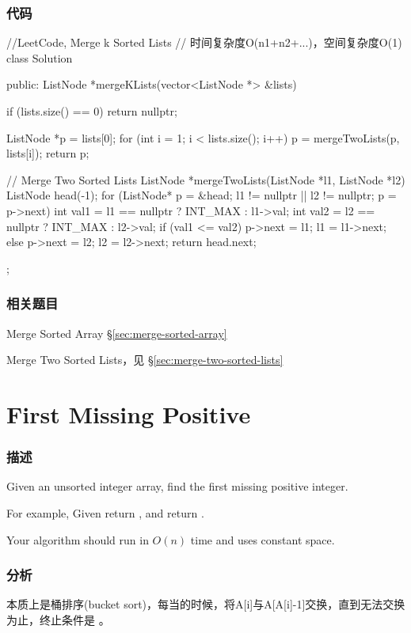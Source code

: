 \subsubsection{代码}
\begin{Code}
//LeetCode, Merge k Sorted Lists
// 时间复杂度O(n1+n2+...)，空间复杂度O(1)
class Solution {
public:
    ListNode *mergeKLists(vector<ListNode *> &lists) {
        if (lists.size() == 0) return nullptr;

        ListNode *p = lists[0];
        for (int i = 1; i < lists.size(); i++) {
            p = mergeTwoLists(p, lists[i]);
        }
        return p;
    }

    // Merge Two Sorted Lists
    ListNode *mergeTwoLists(ListNode *l1, ListNode *l2) {
        ListNode head(-1);
        for (ListNode* p = &head; l1 != nullptr || l2 != nullptr; p = p->next) {
            int val1 = l1 == nullptr ? INT_MAX : l1->val;
            int val2 = l2 == nullptr ? INT_MAX : l2->val;
            if (val1 <= val2) {
                p->next = l1;
                l1 = l1->next;
            } else {
                p->next = l2;
                l2 = l2->next;
            }
        }
        return head.next;
    }
};
\end{Code}


\subsubsection{相关题目}
\begindot
\item Merge Sorted Array \S \ref{sec:merge-sorted-array}
\item Merge Two Sorted Lists，见 \S \ref{sec:merge-two-sorted-lists}
\myenddot


\section{First Missing Positive} %
\label{sec:first-missing-positive}


\subsubsection{描述}
Given an unsorted integer array, find the first missing positive integer.

For example,
Given \fn{[1,2,0]} return ,
and \fn{[3,4,-1,1]} return .

Your algorithm should run in $O(n)$ time and uses constant space.


\subsubsection{分析}
本质上是桶排序(bucket sort)，每当的时候，将A[i]与A[A[i]-1]交换，直到无法交换为止，终止条件是 。


